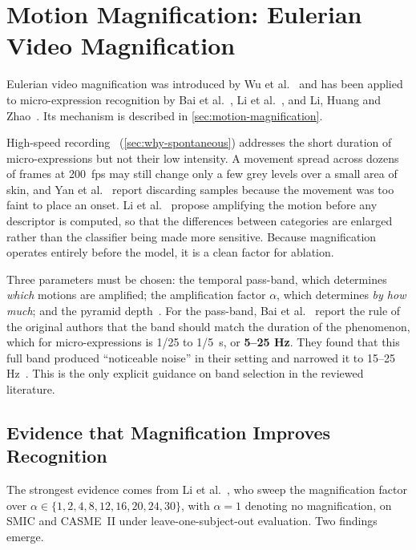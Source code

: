 \section{Motion Magnification: Eulerian Video Magnification}
\label{sec:evm-review}

Eulerian video magnification was introduced by Wu et al.~\cite{wu2012} and has been applied to micro-expression recognition by Bai et al.~\cite{bai2021}, Li et al.~\cite{liX2018}, and Li, Huang and Zhao~\cite{liY2018,liY2021}. Its mechanism is described in \autoref{sec:motion-magnification}.

High-speed recording~\cite{yan2014} (\autoref{sec:why-spontaneous}) addresses the short duration of micro-expressions but not their low intensity. A movement spread across dozens of frames at 200~fps may still change only a few grey levels over a small area of skin, and Yan et al.~\cite{yan2014} report discarding samples because the movement was too faint to place an onset. Li et al.~\cite{liX2018} propose amplifying the motion before any descriptor is computed, so that the differences between categories are enlarged rather than the classifier being made more sensitive. Because magnification operates entirely before the model, it is a clean factor for ablation.

Three parameters must be chosen: the temporal pass-band, which determines \textit{which} motions are amplified; the amplification factor $\alpha$, which determines \textit{by how much}; and the pyramid depth~\cite{wu2012}. For the pass-band, Bai et al.~\cite{bai2021} report the rule of the original authors that the band should match the duration of the phenomenon, which for micro-expressions is 1/25 to 1/5~s, or \textbf{5--25 Hz}. They found that this full band produced ``noticeable noise'' in their setting and narrowed it to 15--25 Hz~\cite{bai2021}. This is the only explicit guidance on band selection in the reviewed literature.

\subsection{Evidence that Magnification Improves Recognition}
\label{sec:evm-evidence}

The strongest evidence comes from Li et al.~\cite{liX2018}, who sweep the magnification factor over $\alpha \in \{1, 2, 4, 8, 12, 16, 20, 24, 30\}$, with $\alpha = 1$ denoting no magnification, on SMIC and CASME~II under leave-one-subject-out evaluation. Two findings emerge.

